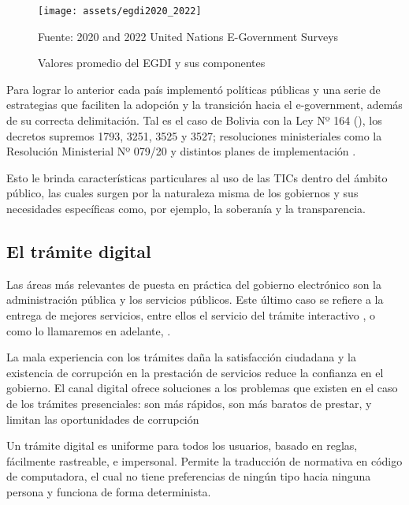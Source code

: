 \begin{figure}[!htpb]
    \centering
    \texttt{[image: assets/egdi2020\_2022]}
    \caption{Valores promedio del EGDI y sus componentes}{Fuente: 2020 and 2022
        United Nations E-Government Surveys}
    \label{fig:egdi2020_2022}
\end{figure}

Para lograr lo anterior cada país implementó políticas públicas y una serie de estrategias que faciliten la adopción y la transición hacia el e-government, además de su correcta delimitación.
Tal es el caso de Bolivia con la Ley Nº 164 (\cite{Ley164Ley2011}),
los decretos supremos 1793, 3251, 3525 y 3527; resoluciones ministeriales como la Resolución Ministerial Nº 079/20 y distintos planes de implementación \cite{DecretoSupremo17932013}\cite{DecretoSupremoNo2017}\cite{DECRETOSUPREMO35252018}\cite{DecretoSupremoNo2018}\cite{ResolucionMinisterialNo2020}\cite{PLANIMPLEMENTACIONSOFTWARE}.

Esto le brinda características particulares al uso de las TICs dentro del ámbito público,
las cuales surgen por la naturaleza misma de los gobiernos y sus necesidades específicas como, por ejemplo, la soberanía y la transparencia.

\subsection{El trámite digital}

Las áreas más relevantes de puesta en práctica del gobierno electrónico son la administración pública y los servicios públicos.
Este último caso se refiere a la entrega de mejores servicios, entre ellos el servicio del trámite interactivo \cite{naserGobiernoElectronicoGestion2011}, o como lo llamaremos en adelante, .

La mala experiencia con los trámites daña la satisfacción ciudadana y la existencia de corrupción en la prestación de servicios reduce la confianza en el gobierno\cite[71]{rosethFinTramiteEterno2018}.
El canal digital ofrece soluciones a los problemas que existen en el caso de los trámites presenciales: son más rápidos, son más baratos de prestar, y limitan las oportunidades de corrupción \cite[99]{rosethFinTramiteEterno2018}

Un trámite digital es uniforme para todos los usuarios, basado en reglas, fácilmente rastreable, e impersonal\cite[105]{rosethFinTramiteEterno2018}.
Permite la traducción de normativa en código de computadora, el cual no tiene preferencias de ningún tipo hacia ninguna persona y funciona de forma determinista.

